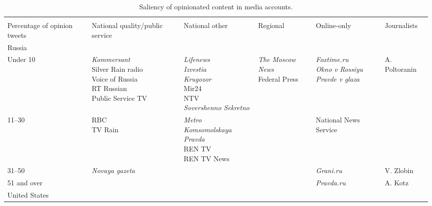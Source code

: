 \begin{table}[ht]%
	\centering
	\caption{Saliency of opinionated content in media accounts.}%
	\label{tab:opinionatedContentSaliency}%
	\begin{adjustbox}{width=1\textwidth}
		\small
		\begin{tabular}{ l  l  l  l  l  l }%
			\toprule
			\multicolumn{6}{c}{\makecell{Hybrid}}\\
			\cline{2-4}
			Percentage of opinion tweets & National quality/public service & National other & Regional & Online-only & Journalists \\
			\hline
			Russia&&&&&\\
			
			Under 10 & \makecell[l]{\textit{Kommersant}\\Silver Rain radio\\Voice of Russia\\RT Russian\\Public Service TV} & \makecell[l]{\textit{Lifenews}\\\textit{Izvestia}\\\textit{Krugozor}\\Mir24\\NTV\\\textit{Sovershenno Sekretno}} & \makecell[l]{\textit{The Moscow News}\\Federal Press}&\makecell[l]{\textit{Foxtime.ru}\\\textit{Okno v Rossiyu}\\\textit{Pravde v glaza}} & A. Poltoranin\\
			
			11--30 & \makecell[l]{RBC\\TV Rain} & \makecell[l]{\textit{Metro}\\\textit{Komsomolskaya Pravda}\\REN TV\\REN TV News} & &National News Service & \\
			
			31--50 & \textit{Novaya gazeta} & & & \textit{Grani.ru} & V. Zlobin\\
			
			51 and over & & & & \textit{Pravda.ru} & A. Kotz\\
			
			United States&&&&&\\
			

\end{tabular}
\end{adjustbox}
\end{table}
